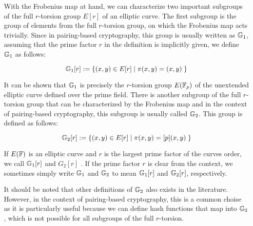 With the Frobenius map at hand, we can characterize two important subgroups of the full $r$-torsion group $E[r]$ of an elliptic curve. The first subgroup is the group of elements from the full $r$-torsion group, on which the Frobenius map acts trivially. Since in pairing-based cryptography, this group is usually written as $\mathbb{G}_1$, assuming that the prime factor $r$ in the definition is implicitly given, we define $\mathbb{G}_1$ as follows:

\begin{equation}
\label{def:pairing_group_G1}
\mathbb{G}_1[r] := \{(x,y)\in E[r]\;|\; \pi(x,y) = (x,y)\;\}
\end{equation}

It can be shown that $\mathbb{G}_1$ is precisely the $r$-torsion group $E(\mathbb{F}_p)$ of the unextended elliptic curve defined over the prime field. There is another subgroup of the full $r$-torsion group that can be characterized by the Frobenius map and in the context of pairing-based cryptography, this subgroup is usually called $\mathbb{G}_2$. This group is defined as follows:

\begin{equation}
\label{def:pairing_group_G2}
\mathbb{G}_2[r]:= \{(x,y)\in E[r]\;|\; \pi(x,y) = [p](x,y)\;\}
\end{equation}

\begin{notation} If $E(\mathbb{F})$ is an elliptic curve and $r$ is the largest prime factor of the curves order, we call $\mathbb{G}_1[r]$ and $G_2[r]$ . If the prime factor $r$ is clear from the context, we sometimes simply write $\mathbb{G}_1$ and $\mathbb{G}_2$ to mean $\mathbb{G}_1[r]$ and $\mathbb{G}_2[r]$, respectively. 
\end{notation}

It should be noted that other definitions of $\mathbb{G}_2$ also exists in the literature. However, in the context of pairing-based cryptography, this is a common choise as it is particularly useful because we can define hash functions that map into $\mathbb{G}_2$, which is not possible for all subgroups of the full $r$-torsion.

